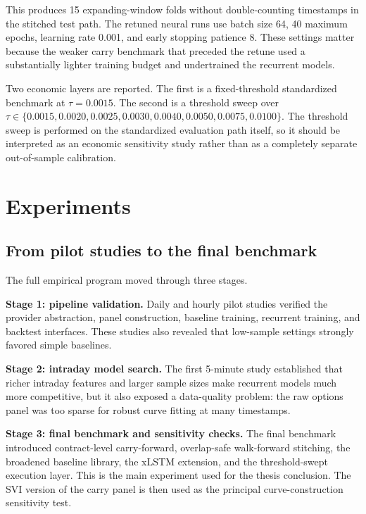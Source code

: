 \documentclass[12pt]{report}
\begin{document}
This produces 15 expanding-window folds without double-counting timestamps in the stitched test path. The retuned neural runs use batch size 64, 40 maximum epochs, learning rate 0.001, and early stopping patience 8. These settings matter because the weaker carry benchmark that preceded the retune used a substantially lighter training budget and undertrained the recurrent models.

Two economic layers are reported. The first is a fixed-threshold standardized benchmark at \(\tau=0.0015\). The second is a threshold sweep over \(\tau \in \{0.0015, 0.0020, 0.0025, 0.0030, 0.0040, 0.0050, 0.0075, 0.0100\}\). The threshold sweep is performed on the standardized evaluation path itself, so it should be interpreted as an economic sensitivity study rather than as a completely separate out-of-sample calibration.

\chapter{Experiments}

\section{From pilot studies to the final benchmark}
The full empirical program moved through three stages.

\textbf{Stage 1: pipeline validation.} Daily and hourly pilot studies verified the provider abstraction, panel construction, baseline training, recurrent training, and backtest interfaces. These studies also revealed that low-sample settings strongly favored simple baselines.

\textbf{Stage 2: intraday model search.} The first 5-minute study established that richer intraday features and larger sample sizes make recurrent models much more competitive, but it also exposed a data-quality problem: the raw options panel was too sparse for robust curve fitting at many timestamps.

\textbf{Stage 3: final benchmark and sensitivity checks.} The final benchmark introduced contract-level carry-forward, overlap-safe walk-forward stitching, the broadened baseline library, the xLSTM extension, and the threshold-swept execution layer. This is the main experiment used for the thesis conclusion. The SVI version of the carry panel is then used as the principal curve-construction sensitivity test.
\end{document}
